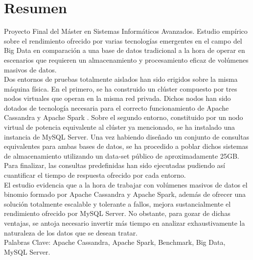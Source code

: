 \section*{Resumen}

Proyecto Final del Máster en Sistemas Informáticos Avanzados. Estudio empírico sobre el rendimiento ofrecido por varias tecnologías emergentes en el campo del Big Data en comparación a una base de datos tradicional a la hora de operar en escenarios que requieren un almacenamiento y procesamiento eficaz de volúmenes masivos de datos.\\

Dos entornos de pruebas totalmente aislados han sido erigidos sobre la misma máquina física. En el primero, se ha construido un clúster compuesto por tres nodos virtuales que operan en la misma red privada. Dichos nodos han sido dotados de tecnología necesaria para el correcto funcionamiento de Apache Cassandra \cite{lakshman2010cassandra} y Apache Spark \cite{zaharia2010spark}. Sobre el segundo entorno, constituido por un nodo virtual de potencia equivalente al clúster ya mencionado, se ha instalado una instancia de MySQL Server. Una vez habiendo diseñado un conjunto de consultas equivalentes para ambas bases de datos, se ha procedido a poblar dichos sistemas de almacenamiento utilizando un data-set público de aproximadamente 25GB. Para finalizar, las consultas predefinidas han sido ejecutadas pudiendo así cuantificar el tiempo de respuesta ofrecido por cada entorno.\\

El estudio evidencia que a la hora de trabajar con volúmenes masivos de datos el binomio formado por Apache Cassandra y Apache Spark, además de ofrecer una solución totalmente escalable y tolerante a fallos, mejora sustancialmente el rendimiento ofrecido por MySQL Server. No obstante, para gozar de dichas ventajas, se antoja necesario invertir más tiempo en analizar exhaustivamente la naturaleza de los datos que se desean tratar.\\


Palabras Clave: Apache Cassandra, Apache Spark, Benchmark, Big Data, MySQL Server.\\
